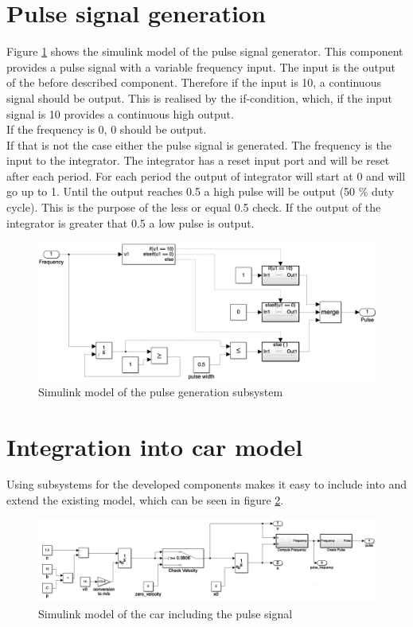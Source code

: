\section{Pulse signal generation}\label{sec:D6Signal}
Figure \ref{fig:D6_Pulse_Signal} shows the simulink model of the pulse signal generator.
This component provides a pulse signal with a variable frequency input.
The input is the output of the before described component.
Therefore if the input is 10, a continuous signal should be output.
This is realised by the if-condition, which, if the input signal is 10 provides a continuous high output.\\
If the frequency is 0, 0 should be output.\\
If that is not the case either the pulse signal is generated.
The frequency is the input to the integrator.
The integrator has a reset input port and will be reset after each period.
For each period the output of integrator will start at 0 and will go up to 1.
Until the output reaches 0.5 a high pulse will be output (50 \% duty cycle).
This is the purpose of the less or equal 0.5 check.
If the output of the integrator is greater that 0.5 a low pulse is output.

\begin{figure}[H]
\centering
\includegraphics[width=1\textwidth]{images/D6_provide_signal.png}
\caption{Simulink model of the pulse generation subsystem}
\label{fig:D6_Pulse_Signal}
\end{figure}

\section{Integration into car model}\label{sec:D6Frequency}
Using subsystems for the developed components makes it easy to include into and extend the existing model, which can be seen in figure \ref{fig:D6_Integation}.
\begin{figure}[H]
\centering
\includegraphics[width=1\textwidth]{images/D6_integration.png}
\caption{Simulink model of the car including the pulse signal}
\label{fig:D6_Integation}
\end{figure}


